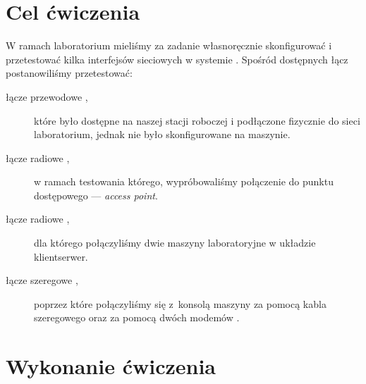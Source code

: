 \documentclass[a4paper,11pt,notitlepage]{article}
\begin{document}

\maketitle
\tableofcontents


\section{Cel ćwiczenia}

W ramach laboratorium mieliśmy za zadanie własnoręcznie skonfigurować i
przetestować kilka interfejsów sieciowych w systemie \bsd. Spośród dostępnych
łącz postanowiliśmy przetestować:

\begin{description}
    \item[łącze przewodowe \eth\textnormal{,}] które było dostępne na naszej
    stacji roboczej i podłączone fizycznie do sieci laboratorium, jednak nie
    było skonfigurowane na maszynie.
    \item[łącze radiowe \wifi\textnormal{,}] w ramach testowania którego,
    wypróbowaliśmy połączenie do punktu dostępowego --- \emph{access point}.
    \item[łącze radiowe \bt\textnormal{,}] dla którego połączyliśmy dwie
    maszyny laboratoryjne w układzie klient\dywiz serwer.
    \item[łącze szeregowe \rs\textnormal{,}] poprzez które połączyliśmy się
    z~konsolą maszyny \zielone{} za pomocą kabla szeregowego oraz za pomocą
    dwóch modemów \bt.
\end{description}


\section{Wykonanie ćwiczenia}








\end{document}
